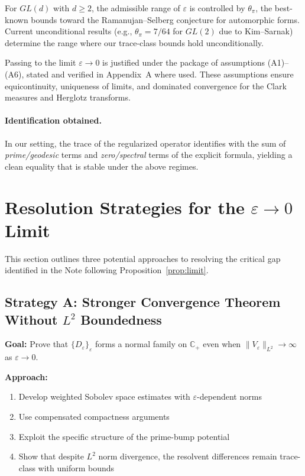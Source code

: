 ﻿\documentclass[12pt,a4paper]{article}
\theoremstyle{definition}
\theoremstyle{remark}
\begin{document}
For $GL(d)$ with $d\ge 2$, the admissible range of $\varepsilon$ is controlled by $\theta_\pi$, the best-known bounds toward the Ramanujan--Selberg conjecture for automorphic forms.
Current unconditional results (e.g., $\theta_\pi=7/64$ for $GL(2)$ due to Kim--Sarnak) determine the range where our trace-class bounds hold unconditionally.

Passing to the limit $\varepsilon\to 0$ is justified under the package of assumptions (A1)--(A6), stated and verified in Appendix~A where used.
These assumptions ensure equicontinuity, uniqueness of limits, and dominated convergence for the Clark measures and Herglotz transforms.

\paragraph{Identification obtained.}
In our setting, the trace of the regularized operator identifies with the sum of \emph{prime/geodesic} terms and \emph{zero/spectral} terms of the explicit formula, yielding a clean equality that is stable under the above regimes.

\section{Resolution Strategies for the $\varepsilon \to 0$ Limit}\label{sec:resolution-strategies}

This section outlines three potential approaches to resolving the critical gap identified in the Note following Proposition~\ref{prop:limit}.

\subsection{Strategy A: Stronger Convergence Theorem Without $L^2$ Boundedness}

\textbf{Goal:} Prove that $\{D_\varepsilon\}_\varepsilon$ forms a normal family on $\mathbb{C}_+$ even when $\|V_\varepsilon\|_{L^2} \to \infty$ as $\varepsilon \to 0$.

\textbf{Approach:}
\begin{enumerate}
\item Develop weighted Sobolev space estimates with $\varepsilon$-dependent norms
\item Use compensated compactness arguments
\item Exploit the specific structure of the prime-bump potential
\item Show that despite $L^2$ norm divergence, the resolvent differences remain trace-class with uniform bounds
\end{enumerate}
\end{document}
